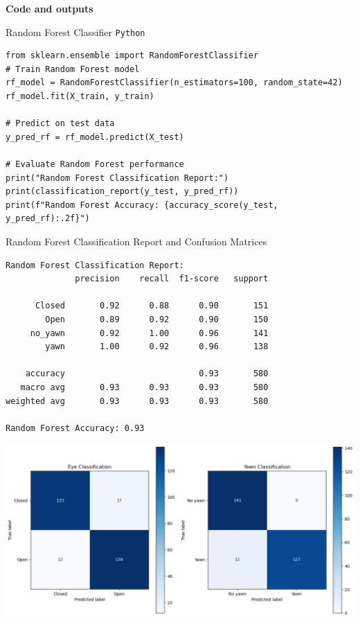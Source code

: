 \documentclass{modeleRapport}
\begin{document}
\bigskip
\textbf{Code and outputs\\}
\begin{codebox}[RF Classifier]{Random Forest Classifier \texttt{Python}}
\begin{verbatim}
from sklearn.ensemble import RandomForestClassifier
# Train Random Forest model
rf_model = RandomForestClassifier(n_estimators=100, random_state=42)
rf_model.fit(X_train, y_train)

# Predict on test data
y_pred_rf = rf_model.predict(X_test)

# Evaluate Random Forest performance
print("Random Forest Classification Report:")
print(classification_report(y_test, y_pred_rf))
print(f"Random Forest Accuracy: {accuracy_score(y_test, y_pred_rf):.2f}")
\end{verbatim}
\end{codebox}


\begin{codebox}[OutputD]{ Random Forest Classification Report and Confusion Matrices}
\begin{verbatim}
Random Forest Classification Report:
              precision    recall  f1-score   support

      Closed       0.92      0.88      0.90       151
        Open       0.89      0.92      0.90       150
     no_yawn       0.92      1.00      0.96       141
        yawn       1.00      0.92      0.96       138

    accuracy                           0.93       580
   macro avg       0.93      0.93      0.93       580
weighted avg       0.93      0.93      0.93       580

Random Forest Accuracy: 0.93
\end{verbatim}

\includegraphics[width=15cm]{Images/RF_cm.png}

\end{codebox}
\end{document}
